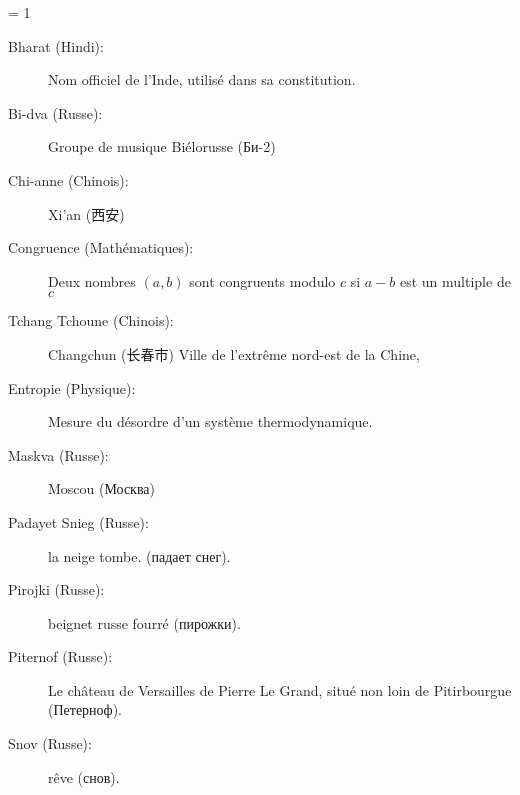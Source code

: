 {    \ifnum \isPayant = 1 
        \begin{description}
            \item[Bharat (Hindi):] Nom officiel de l'Inde, utilisé dans sa constitution.
            \item[Bi-dva (Russe):] Groupe de musique Biélorusse (Би-2)
            \item[Chi-anne (Chinois):] \og{}Xi'an\fg{} ({\chinesefont 西安})
            \item[Congruence (Mathématiques):] Deux nombres $(a,b)$ sont
                congruents modulo $c$ si $a-b$ est un multiple de $c$
            \item[Tchang Tchoune (Chinois):] \og{}Changchun\fg{} ({\chinesefont 长春市})
                Ville de l'extrême nord-est de la Chine, 
            \item[Entropie (Physique):] Mesure du \og{}désordre\fg{} d'un système thermodynamique.
            \item[Maskva (Russe):] \og{}Moscou\fg{} (Москва)
            \item[Padayet Snieg (Russe):] \og{}la neige tombe\fg{}.
            (падает снег).
            \item[Pirojki (Russe):] beignet russe fourré (пирожки).
            \item[Piternof (Russe):] Le château de Versailles de Pierre Le Grand,
            situé non loin de Pitirbourgue (Петерноф).
            \item[Snov (Russe):] rêve (снов).
        \end{description}
    \fi
}{
}
